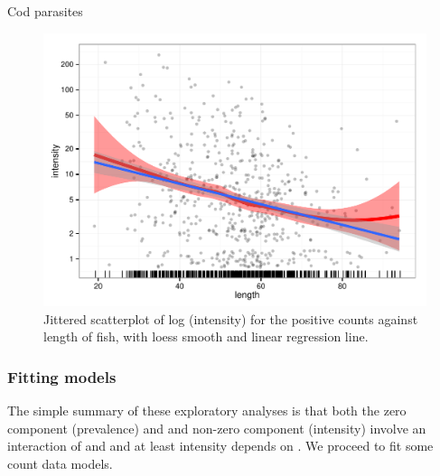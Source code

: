 \documentclass[11pt]{book}\usepackage[]{graphicx}\usepackage[]{color}
\newenvironment{knitrout}{}{} %
\renewenvironment{knitrout}{\small\renewcommand{\baselinestretch}{.85}}{} %
\begin{document}
\begin{Example}[cod1]{Cod parasites}
\begin{knitrout}
\begin{figure}[!htbp]
\centerline{\includegraphics[width=.6\textwidth]{ch09/fig/cod1-length-scat} }

\caption[Jittered scatterplot of log (intensity) for the positive counts against length of fish, with loess smooth and linear regression line]{Jittered scatterplot of log (intensity) for the positive counts against length of fish, with loess smooth and linear regression line.\label{fig:cod1-length-scat}}
\end{figure}


\end{knitrout}
\end{Example}

\subsubsection{Fitting models}

The simple summary of these exploratory analyses is that both the zero component (prevalence) and 
and non-zero component (intensity) 
involve an interaction of  and  and at least intensity depends on .  
We proceed to fit some count data models.
\end{document}
